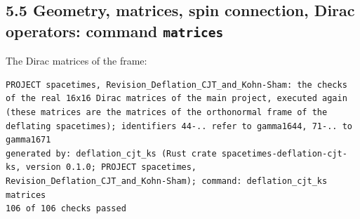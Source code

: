 \documentclass[
  10pt,
]{article}
\begin{document}
\hypertarget{geometry-matrices-spin-connection-dirac-operators-command-matrices}{%
\subsection{\texorpdfstring{5.5 Geometry, matrices, spin connection,
Dirac operators: command
\texttt{matrices}}{5.5 Geometry, matrices, spin connection, Dirac operators: command matrices}}\label{geometry-matrices-spin-connection-dirac-operators-command-matrices}}

The Dirac matrices of the frame:

\begin{verbatim}
PROJECT spacetimes, Revision_Deflation_CJT_and_Kohn-Sham: the checks of the real 16x16 Dirac matrices of the main project, executed again (these matrices are the matrices of the orthonormal frame of the deflating spacetimes); identifiers 44-.. refer to gamma1644, 71-.. to gamma1671
generated by: deflation_cjt_ks (Rust crate spacetimes-deflation-cjt-ks, version 0.1.0; PROJECT spacetimes, Revision_Deflation_CJT_and_Kohn-Sham); command: deflation_cjt_ks matrices
106 of 106 checks passed


\end{verbatim}
\end{document}
